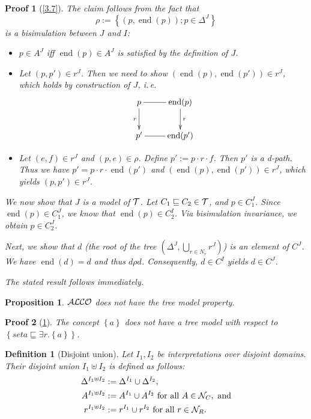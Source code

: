 \documentclass[openany]{scrbook}
\theoremstyle{break}
\newtheorem{Definition}[Theorem]{Definition}
\newtheorem{Proposition}[Theorem]{Proposition}
\theoremstyle{nonumberbreak}
\theoremstyle{nonumberplain}
\theoremstyle{nonumberbreak}
\newtheorem{Proof}{Proof}
\newcommand{\set}[1]{\left\{#1\right\}}
\newcommand{\ie}{i{.}\,e{.}\xspace}
\newcommand{\ALCO}{{\cal A}{\cal L}{\cal C}{\cal O}}
\newcommand{\en}{\operatorname{end}}
\begin{document}
\begin{Proof}[\cref{3.7}]
  The claim follows from the fact that
  \begin{equation*}
    \rho := \set{(p, \en(p)); p \in \Delta^J}
  \end{equation*}
  is a bisimulation between $J$ and $I$:
  \begin{itemize}
  \item $p \in A^J$ iff $\en(p) \in A^J$ is satisfied by the
    definition of $J$.
  \item Let $(p, p') \in r^J$. Then we need to show $(\en(p), \en(p'))
    \in r^J$, which holds by construction of $J$, \ie
    \begin{equation*}
      \xymatrix{p \ar@{-}[r] \ar[d]_r & \en(p) \ar[d]^r \\
        p' \ar@{-}[r] & \en(p')}
    \end{equation*}
  \item Let $(e, f) \in r^J$ and $(p, e) \in \rho$.
    Define $p' := p \cdot r \cdot f$. Then $p'$ is a d-path. Thus we
    have $p' = p \cdot r \cdot \en(p')$ and $(\en(p), \en(p')) \in
    r^J$, which yields $(p, p') \in r^J$.
  \end{itemize}

  We now show that $J$ is a model of ${\cal T}$. Let $C_1 \sqsubseteq
  C_2 \in {\cal T}$, and $p \in C_1^J$. Since $\en(p) \in C_1^J$, we
  know that $\en(p) \in C_2^I$. Via bisimulation invariance, we obtain
  $p \in C_2^J$.

  Next, we show that $d$ (the root of the tree $(\Delta^J, \bigcup_{r
    \in N_r}{r^J})$) is an element of $C^J$.
  We have $\en(d) = d$ and thus $d \rho d$. Consequently, $d \in C^I$
  yields $d \in C^J$.

  The stated result follows immediately.
\end{Proof}

\begin{Proposition}
  \label{3.8}
  $\ALCO$ does not have the tree model property.
\end{Proposition}

\begin{Proof}[\cref{3.8}]
  The concept $\set{a}$ does not have a tree model with respect to
  $\set{set{a} \sqsubseteq \exists r.\set{a}}$.
\end{Proof}

\begin{Definition}[Disjoint union]
  \label{3.9}
  Let $I_1, I_2$ be interpretations over disjoint domains.
  Their disjoint union $I_1 \uplus I_2$ is defined as follows:
  \begin{align*}
    \Delta^{I_1 \uplus I_2} & := \Delta^{I_1} \cup \Delta^{I_2}, \\
    A^{I_1 \uplus I_2} & := A^{I_1} \cup A^{I_2}\ \text{for all}\ A \in
    {\cal N}_C,\ \text{and} \\
    r^{I_1 \uplus I_2} & := r^{I_1} \cup r^{I_2}\ \text{for all}\ r
    \in {\cal N}_R.
  \end{align*}
\end{Definition}
\end{document}
